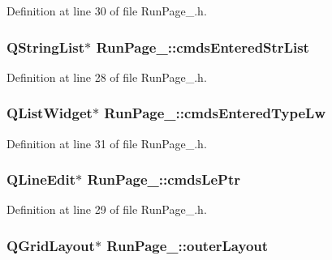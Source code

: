 Definition at line 30 of file Run\-Page\-\_.\-h.

\hypertarget{class_run_page__3_afd64ae06d4a206ac0336695d2ed4501b}{
\subsubsection[{cmds\-Entered\-Str\-List}]{\setlength{\rightskip}{0pt plus 5cm}Q\-String\-List$\ast$ Run\-Page\-\_\-::cmds\-Entered\-Str\-List\hspace{0.3cm}{\ttfamily [private]}}}\label{class_run_page__3_afd64ae06d4a206ac0336695d2ed4501b}


Definition at line 28 of file Run\-Page\-\_.\-h.

\hypertarget{class_run_page__3_a5209fe0d1718a40acb124e54895921f2}{
\subsubsection[{cmds\-Entered\-Type\-Lw}]{\setlength{\rightskip}{0pt plus 5cm}Q\-List\-Widget$\ast$ Run\-Page\-\_\-::cmds\-Entered\-Type\-Lw\hspace{0.3cm}{\ttfamily [private]}}}\label{class_run_page__3_a5209fe0d1718a40acb124e54895921f2}


Definition at line 31 of file Run\-Page\-\_.\-h.

\hypertarget{class_run_page__3_a9feed842f177140df74c6194851114ad}{
\subsubsection[{cmds\-Le\-Ptr}]{\setlength{\rightskip}{0pt plus 5cm}Q\-Line\-Edit$\ast$ Run\-Page\-\_\-::cmds\-Le\-Ptr\hspace{0.3cm}{\ttfamily [private]}}}\label{class_run_page__3_a9feed842f177140df74c6194851114ad}


Definition at line 29 of file Run\-Page\-\_.\-h.

\hypertarget{class_run_page__3_a8ca3e66cc9b6534b06341d507a7bea4b}{
\subsubsection[{outer\-Layout}]{\setlength{\rightskip}{0pt plus 5cm}Q\-Grid\-Layout$\ast$ Run\-Page\-\_\-::outer\-Layout\hspace{0.3cm}{\ttfamily [private]}}}\label{class_run_page__3_a8ca3e66cc9b6534b06341d507a7bea4b}


